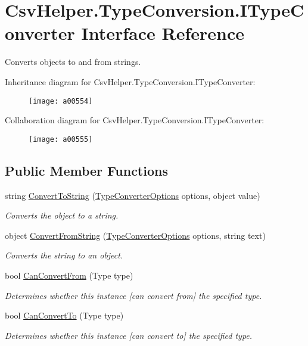 \hypertarget{a00123}{\section{Csv\-Helper.\-Type\-Conversion.\-I\-Type\-Converter Interface Reference}
\label{a00123}
}


Converts objects to and from strings.  




Inheritance diagram for Csv\-Helper.\-Type\-Conversion.\-I\-Type\-Converter\-:
\nopagebreak
\begin{figure}[H]
\begin{center}
\leavevmode
\texttt{[image: a00554]}
\end{center}
\end{figure}


Collaboration diagram for Csv\-Helper.\-Type\-Conversion.\-I\-Type\-Converter\-:
\nopagebreak
\begin{figure}[H]
\begin{center}
\leavevmode
\texttt{[image: a00555]}
\end{center}
\end{figure}
\subsection*{Public Member Functions}
\begin{DoxyCompactItemize}
\item 
string \hyperlink{a00123_a90c465c63dbcf913f38aa878f35e77c7}{Convert\-To\-String} (\hyperlink{a00178}{Type\-Converter\-Options} options, object value)
\begin{DoxyCompactList}\small\item\em Converts the object to a string. \end{DoxyCompactList}\item 
object \hyperlink{a00123_ab598e04c22e5a7890b6d21011492283e}{Convert\-From\-String} (\hyperlink{a00178}{Type\-Converter\-Options} options, string text)
\begin{DoxyCompactList}\small\item\em Converts the string to an object. \end{DoxyCompactList}\item 
bool \hyperlink{a00123_ae1ad863656f4fa96bd846a41344c9349}{Can\-Convert\-From} (Type type)
\begin{DoxyCompactList}\small\item\em Determines whether this instance \mbox{[}can convert from\mbox{]} the specified type. \end{DoxyCompactList}\item 
bool \hyperlink{a00123_a168b03dad37fcb6882101c93deac8111}{Can\-Convert\-To} (Type type)
\begin{DoxyCompactList}\small\item\em Determines whether this instance \mbox{[}can convert to\mbox{]} the specified type. \end{DoxyCompactList}\end{DoxyCompactItemize}


